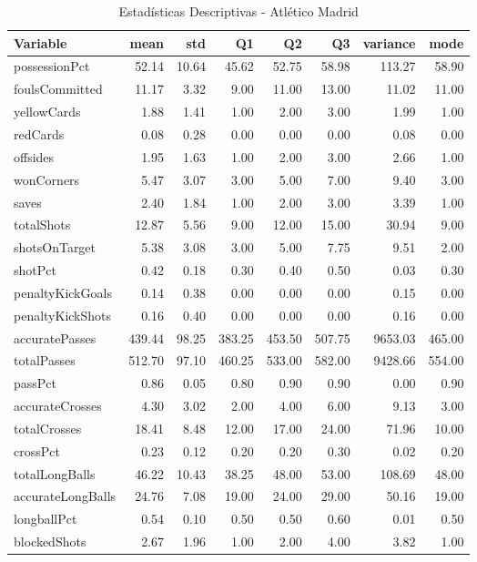 \begin{table}[H]
\centering
\caption{Estadísticas Descriptivas - Atlético Madrid}
\label{tab:esp_atletico_madrid}
\small
\begin{tabular}{lrrrrrrr}
\hline
Variable & mean & std & Q1 & Q2 & Q3 & variance & mode \\
\hline
possessionPct & 52.14 & 10.64 & 45.62 & 52.75 & 58.98 & 113.27 & 58.90 \\
foulsCommitted & 11.17 & 3.32 & 9.00 & 11.00 & 13.00 & 11.02 & 11.00 \\
yellowCards & 1.88 & 1.41 & 1.00 & 2.00 & 3.00 & 1.99 & 1.00 \\
redCards & 0.08 & 0.28 & 0.00 & 0.00 & 0.00 & 0.08 & 0.00 \\
offsides & 1.95 & 1.63 & 1.00 & 2.00 & 3.00 & 2.66 & 1.00 \\
wonCorners & 5.47 & 3.07 & 3.00 & 5.00 & 7.00 & 9.40 & 3.00 \\
saves & 2.40 & 1.84 & 1.00 & 2.00 & 3.00 & 3.39 & 1.00 \\
totalShots & 12.87 & 5.56 & 9.00 & 12.00 & 15.00 & 30.94 & 9.00 \\
shotsOnTarget & 5.38 & 3.08 & 3.00 & 5.00 & 7.75 & 9.51 & 2.00 \\
shotPct & 0.42 & 0.18 & 0.30 & 0.40 & 0.50 & 0.03 & 0.30 \\
penaltyKickGoals & 0.14 & 0.38 & 0.00 & 0.00 & 0.00 & 0.15 & 0.00 \\
penaltyKickShots & 0.16 & 0.40 & 0.00 & 0.00 & 0.00 & 0.16 & 0.00 \\
accuratePasses & 439.44 & 98.25 & 383.25 & 453.50 & 507.75 & 9653.03 & 465.00 \\
totalPasses & 512.70 & 97.10 & 460.25 & 533.00 & 582.00 & 9428.66 & 554.00 \\
passPct & 0.86 & 0.05 & 0.80 & 0.90 & 0.90 & 0.00 & 0.90 \\
accurateCrosses & 4.30 & 3.02 & 2.00 & 4.00 & 6.00 & 9.13 & 3.00 \\
totalCrosses & 18.41 & 8.48 & 12.00 & 17.00 & 24.00 & 71.96 & 10.00 \\
crossPct & 0.23 & 0.12 & 0.20 & 0.20 & 0.30 & 0.02 & 0.20 \\
totalLongBalls & 46.22 & 10.43 & 38.25 & 48.00 & 53.00 & 108.69 & 48.00 \\
accurateLongBalls & 24.76 & 7.08 & 19.00 & 24.00 & 29.00 & 50.16 & 19.00 \\
longballPct & 0.54 & 0.10 & 0.50 & 0.50 & 0.60 & 0.01 & 0.50 \\
blockedShots & 2.67 & 1.96 & 1.00 & 2.00 & 4.00 & 3.82 & 1.00 \\

\end{tabular}
\end{table}
